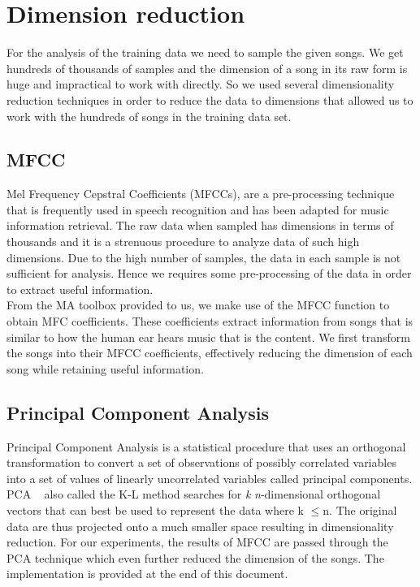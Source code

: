 \documentclass[12pt]{article}
\begin{document}
\section{Dimension reduction}
\begin{flushleft}
For the analysis of the training data we need to sample the given songs. We get hundreds of thousands of samples and the dimension of a song in its raw form is huge and impractical to work with directly. So we used several dimensionality reduction techniques in order to reduce the data to dimensions that allowed us to work with the hundreds of songs in the training data set.\\
\subsection{MFCC}
Mel Frequency Cepstral Coefficients (MFCCs), are a pre-processing technique that is frequently used in speech recognition and has been adapted for music information retrieval. The raw data when sampled has dimensions in terms of thousands and it is a strenuous procedure to analyze data of such high dimensions. Due to the high number of samples, the data in each sample is not sufficient for analysis. Hence we requires some pre-processing of the data in order to extract useful information.\\
\vspace{0.5em}
From the MA toolbox provided to us, we make use of the MFCC function to obtain MFC coefficients. These coefficients extract information from songs that is similar to how the human ear hears music that is the content. We first transform the songs into their MFCC coefficients, effectively reducing the dimension of each song while retaining useful information.
\subsection{Principal Component Analysis}
Principal Component Analysis is a statistical procedure that uses an orthogonal transformation to convert a set of observations of possibly correlated variables into a set of values of linearly uncorrelated variables called principal components.\\
\vspace{0.5em}
PCA                     ~\cite{PCA} also called the K-L method searches for \textit{k} \textit{n}-dimensional orthogonal vectors that can best be used to represent the data where k $\leq$n. The original data are thus projected onto a much smaller space resulting in dimensionality reduction. For our experiments, the results of MFCC are passed through the PCA technique which even further reduced the dimension of the songs. The implementation is provided at the end of this document.

\end{flushleft}
\end{document}
